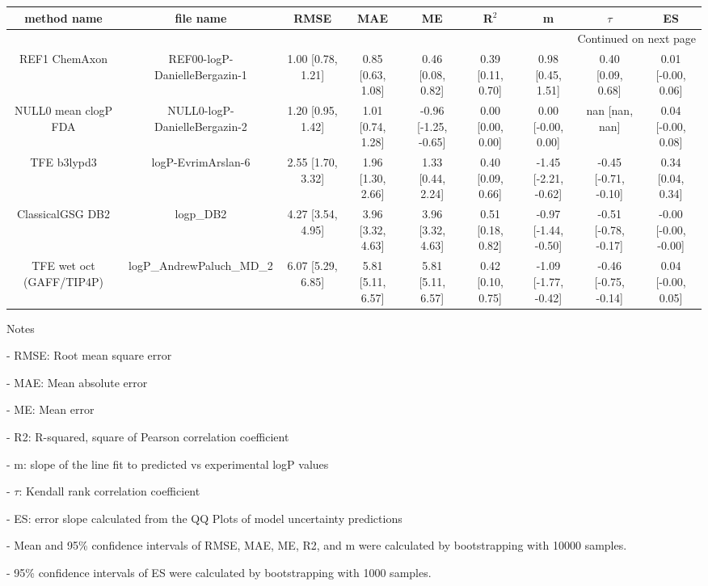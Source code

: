 \documentclass{article}
\begin{document}
\begin{center}
\scriptsize
\begin{longtable}{|ccccccccc|}
\toprule
              method name &                      file name &               RMSE &                MAE &                    ME &              R$^2$ &                     m &                $\tau$ &                    ES \\
\midrule
\endhead
\midrule
\multicolumn{9}{r}{{Continued on next page}} \\
\midrule
\endfoot

\bottomrule
\endlastfoot
            REF1 ChemAxon &  REF00-logP-DanielleBergazin-1 &  1.00 [0.78, 1.21] &  0.85 [0.63, 1.08] &     0.46 [0.08, 0.82] &  0.39 [0.11, 0.70] &     0.98 [0.45, 1.51] &     0.40 [0.09, 0.68] &    0.01 [-0.00, 0.06] \\
     NULL0 mean clogP FDA &  NULL0-logP-DanielleBergazin-2 &  1.20 [0.95, 1.42] &  1.01 [0.74, 1.28] &  -0.96 [-1.25, -0.65] &  0.00 [0.00, 0.00] &    0.00 [-0.00, 0.00] &        nan [nan, nan] &    0.04 [-0.00, 0.08] \\
              TFE b3lypd3 &             logP-EvrimArslan-6 &  2.55 [1.70, 3.32] &  1.96 [1.30, 2.66] &     1.33 [0.44, 2.24] &  0.40 [0.09, 0.66] &  -1.45 [-2.21, -0.62] &  -0.45 [-0.71, -0.10] &     0.34 [0.04, 0.34] \\
         ClassicalGSG DB2 &                      logp\_DB2 &  4.27 [3.54, 4.95] &  3.96 [3.32, 4.63] &     3.96 [3.32, 4.63] &  0.51 [0.18, 0.82] &  -0.97 [-1.44, -0.50] &  -0.51 [-0.78, -0.17] &  -0.00 [-0.00, -0.00] \\
 TFE wet oct (GAFF/TIP4P) &      logP\_AndrewPaluch\_MD\_2 &  6.07 [5.29, 6.85] &  5.81 [5.11, 6.57] &     5.81 [5.11, 6.57] &  0.42 [0.10, 0.75] &  -1.09 [-1.77, -0.42] &  -0.46 [-0.75, -0.14] &    0.04 [-0.00, 0.05] \\
\end{longtable}
\end{center}

Notes

- RMSE: Root mean square error

- MAE: Mean absolute error

- ME: Mean error

- R2: R-squared, square of Pearson correlation coefficient

- m: slope of the line fit to predicted vs experimental logP values

- $\tau$:  Kendall rank correlation coefficient

- ES: error slope calculated from the QQ Plots of model uncertainty predictions

- Mean and 95\% confidence intervals of RMSE, MAE, ME, R2, and m were calculated by bootstrapping with 10000 samples.

- 95\% confidence intervals of ES were calculated by bootstrapping with 1000 samples.\end{document}
\end{document}

